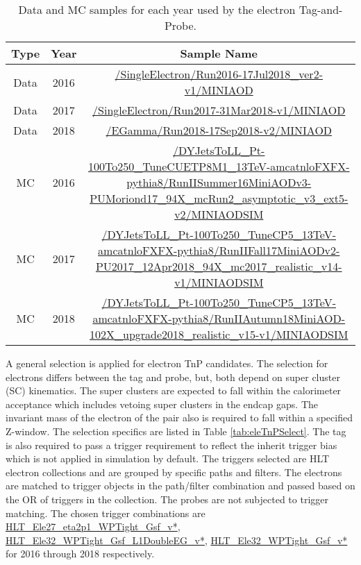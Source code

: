 \begin{table}
\caption{ Data and MC samples for each year used by the electron Tag-and-Probe. }
\label{tab:electronTnPSamples}
\scriptsize
\begin{adjustwidth}{-0.5in}{-1in}
\begin{tabular}{cc|c}
\hline
Type & Year & Sample Name \\ 
\hline
\hline 
Data & 2016 & \tiny \url{/SingleElectron/Run2016-17Jul2018_ver2-v1/MINIAOD}  \\  
Data & 2017 & \tiny \url{/SingleElectron/Run2017-31Mar2018-v1/MINIAOD} \\  
Data & 2018 & \tiny \url{/EGamma/Run2018-17Sep2018-v2/MINIAOD} \\ 
\hline 
MC & 2016 & \tiny \url{/DYJetsToLL_Pt-100To250_TuneCUETP8M1_13TeV-amcatnloFXFX-pythia8/RunIISummer16MiniAODv3-PUMoriond17_94X_mcRun2_asymptotic_v3_ext5-v2/MINIAODSIM} \\ 
MC & 2017 & \tiny \url{/DYJetsToLL_Pt-100To250_TuneCP5_13TeV-amcatnloFXFX-pythia8/RunIIFall17MiniAODv2-PU2017_12Apr2018_94X_mc2017_realistic_v14-v1/MINIAODSIM} \\ 
MC & 2018 & \tiny \url{/DYJetsToLL_Pt-100To250_TuneCP5_13TeV-amcatnloFXFX-pythia8/RunIIAutumn18MiniAOD-102X_upgrade2018_realistic_v15-v1/MINIAODSIM} \\ 
\hline
\end{tabular} 
\end{adjustwidth}
\end{table}




A general selection is applied for electron TnP candidates. The selection for electrons differs between the tag and probe, but, both depend on super cluster (SC) kinematics. The super clusters are expected to fall within the calorimeter acceptance which includes vetoing super clusters in the endcap gaps. The invariant mass of the electron of the pair also is required to fall within a specified Z-window. The selection specifics are listed in Table \ref{tab:eleTnPSelect}.  The tag is also required to pass a trigger requirement to reflect the inherit trigger bias which is not applied in simulation by default. The triggers selected are HLT electron collections and are grouped by specific paths and filters. The electrons are matched to trigger objects in the path/filter combination and passed based on the OR of triggers in the collection. The probes are not subjected to trigger matching. The chosen trigger combinations are \url{HLT_Ele27_eta2p1_WPTight_Gsf_v*}, \url{HLT_Ele32_WPTight_Gsf_L1DoubleEG_v*}, \url{HLT_Ele32_WPTight_Gsf_v*} for 2016 through 2018 respectively.\\


